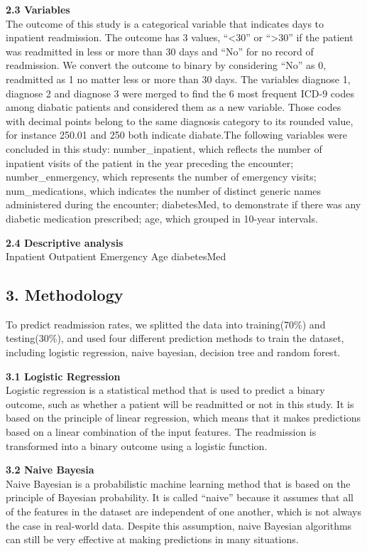 \documentclass[
]{article}
\begin{document}
\textbf{2.3 Variables}\\
The outcome of this study is a categorical variable that indicates days
to inpatient readmission. The outcome has 3 values, ``\textless30'' or
``\textgreater30'' if the patient was readmitted in less or more than 30
days and ``No'' for no record of readmission. We convert the outcome to
binary by considering ``No'' as 0, readmitted as 1 no matter less or
more than 30 days. The variables diagnose 1, diagnose 2 and diagnose 3
were merged to find the 6 most frequent ICD-9 codes among diabatic
patients and considered them as a new variable. Those codes with decimal
points belong to the same diagnosis category to its rounded value, for
instance 250.01 and 250 both indicate diabate.The following variables
were concluded in this study: number\_inpatient, which reflects the
number of inpatient visits of the patient in the year preceding the
encounter; number\_enmergency, which represents the number of emergency
visits; num\_medications, which indicates the number of distinct generic
names administered during the encounter; diabetesMed, to demonstrate if
there was any diabetic medication prescribed; age, which grouped in
10-year intervals.

\textbf{2.4 Descriptive analysis}\\
Inpatient Outpatient Emergency Age diabetesMed

\hypertarget{methodology}{%
\subsection{3. Methodology}\label{methodology}}

To predict readmission rates, we splitted the data into training(70\%)
and testing(30\%), and used four different prediction methods to train
the dataset, including logistic regression, naive bayesian, decision
tree and random forest.

\textbf{3.1 Logistic Regression}\\
Logistic regression is a statistical method that is used to predict a
binary outcome, such as whether a patient will be readmitted or not in
this study. It is based on the principle of linear regression, which
means that it makes predictions based on a linear combination of the
input features. The readmission is transformed into a binary outcome
using a logistic function.

\textbf{3.2 Naive Bayesia}\\
Naive Bayesian is a probabilistic machine learning method that is based
on the principle of Bayesian probability. It is called ``naive'' because
it assumes that all of the features in the dataset are independent of
one another, which is not always the case in real-world data. Despite
this assumption, naive Bayesian algorithms can still be very effective
at making predictions in many situations.
\end{document}

